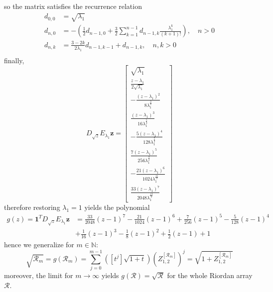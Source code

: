 so the matrix satisfies the recurrence relation
\begin{displaymath}
\begin{split}
d_{0,0}&=\sqrt{\lambda_{1}}\\
d_{n,0}&=-\left(\frac{1}{2} d_{n-1, 0} + \frac{3}{2}\sum_{k=1}^{n-1}{d_{n-1, k}\frac{\lambda_{1}^{k}}{(k+1)!}}\right), \quad n>0 \\
d_{n,k}&=\frac{3-2k}{2\lambda_{1}}d_{n-1, k-1} + d_{n-1,k}, \quad n,k > 0\\
\end{split}
\end{displaymath}
finally,
\begin{displaymath}
D_{\sqrt{z}}E_{\lambda_{1}}\boldsymbol{z} = \left[\begin{matrix}\sqrt{\lambda_{1}}\\\frac{z - \lambda_{1}}{2 \sqrt{\lambda_{1}}}\\- \frac{\left(z - \lambda_{1}\right)^{2}}{8 \lambda_{1}^{\frac{3}{2}}}\\\frac{\left(z - \lambda_{1}\right)^{3}}{16 \lambda_{1}^{\frac{5}{2}}}\\- \frac{5 \left(z - \lambda_{1}\right)^{4}}{128 \lambda_{1}^{\frac{7}{2}}}\\\frac{7 \left(z - \lambda_{1}\right)^{5}}{256 \lambda_{1}^{\frac{9}{2}}}\\- \frac{21 \left(z - \lambda_{1}\right)^{6}}{1024 \lambda_{1}^{\frac{11}{2}}}\\\frac{33 \left(z - \lambda_{1}\right)^{7}}{2048 \lambda_{1}^{\frac{13}{2}}}\end{matrix}\right]
\end{displaymath}
therefore restoring $\lambda_{1}=1$ yields the polynomial
\begin{displaymath}
\begin{split}
g{\left (z \right )} = \boldsymbol{1}^{T}D_{\sqrt{z}}E_{\lambda_{1}}\boldsymbol{z} &= \frac{33}{2048} \left(z - 1\right)^{7} - \frac{21}{1024} \left(z - 1\right)^{6} + \frac{7}{256} \left(z - 1\right)^{5} - \frac{5}{128} \left(z - 1\right)^{4} \\
    &+ \frac{1}{16} \left(z - 1\right)^{3} - \frac{1}{8} \left(z - 1\right)^{2} + \frac{1}{2}(z-1) + 1
\end{split}
\end{displaymath}
hence we generalize for $m\in\mathbb{N}$:
\begin{displaymath}
\sqrt{\mathcal{R}_{m}} = g{\left (\mathcal{R}_{m} \right )} = \sum_{j=0}^{m-1}{\left(\left[t^{j}\right]\sqrt{1+t}\right){\left(Z_{1,2}^{[\mathcal{R}_{m}]}\right)^{j} }} = \sqrt{1+Z_{1,2}^{[\mathcal{R}_{m}]}}
\end{displaymath}
moreover, the limit for $m \rightarrow \infty$ yields $ g{\left (\mathcal{R} \right )} = \sqrt{\mathcal{R}} $ for the whole Riordan array $\mathcal{R}$.

